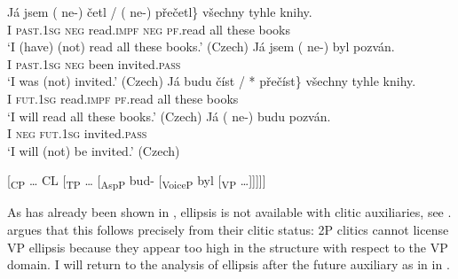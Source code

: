 \documentclass[output=paper,colorlinks,citecolor=brown,
modfonts
]{langscibook}
\begin{document}
\begin{exe}
\ex	\label{11}
\begin{xlist}
\ex\label{11a} \gll Já jsem \minsp{\{} (\hspace{-2pt} ne-) četl / (\hspace{-2pt} ne-) přečetl\} všechny tyhle knihy.\\
I  \textsc{past}.\textsc{1sg} {} {} \textsc{neg} read.\textsc{impf}  {} {} \textsc{neg} \textsc{pf}.read all these books\\
\glt  `I (have) (not) read all these books.' \hfill (Czech)
\ex\label{11b} \gll Já jsem  (\hspace{-2pt} ne-) byl pozván.\\
I  \textsc{past}.\textsc{1sg} {} \textsc{neg} been invited.\textsc{pass} \\
\glt `I was (not) invited.' \hfill (Czech)
\ex\label{11c}\gll Já budu \minsp{\{} číst / *\hspace{-2pt} přečíst\} všechny tyhle knihy.\\
I \textsc{fut}.\textsc{1sg} {} read.\textsc{impf} {} {} \textsc{pf}.read all these books\\
\glt   `I will read all these books.'  \hfill (Czech)
\ex\label{11d}\gll Já (\hspace{-2pt} ne-) budu  pozván.\\
I  {} \textsc{neg} \textsc{fut}.\textsc{1sg} invited.\textsc{pass}\\
\glt `I will (not) be invited.'  \hfill (Czech)
\end{xlist}

\ex \label{12} {[\textsubscript{CP} {\ldots} CL [\textsubscript{TP} {\ldots} [\textsubscript{AspP} bud- [\textsubscript{VoiceP}  byl [\textsubscript{VP} {\ldots}]]]]]}
\end{exe}

\noindent As has already been shown in , ellipsis is not available with clitic auxiliaries, see . \cite{Gruet-Skrabalova2012} argues that this follows precisely from their clitic status: 2P clitics cannot license VP ellipsis because they appear too high in the structure with respect to the VP domain. I will return to the analysis of ellipsis after the future auxiliary as in  in .

\ea\label{13}
\z\z
\end{document}
